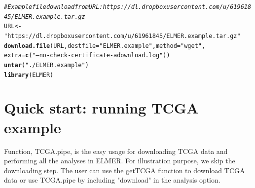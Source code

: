 \documentclass{article}\usepackage[]{graphicx}\usepackage[]{color}
\makeatletter
\newcommand{\hlstr}[1]{\textcolor[rgb]{0.192,0.494,0.8}{#1}}%
\newcommand{\hlcom}[1]{\textcolor[rgb]{0.678,0.584,0.686}{\textit{#1}}}%
\newcommand{\hlstd}[1]{\textcolor[rgb]{0.345,0.345,0.345}{#1}}%
\newcommand{\hlkwb}[1]{\textcolor[rgb]{0.69,0.353,0.396}{#1}}%
\newcommand{\hlkwc}[1]{\textcolor[rgb]{0.333,0.667,0.333}{#1}}%
\newcommand{\hlkwd}[1]{\textcolor[rgb]{0.737,0.353,0.396}{\textbf{#1}}}%
\newenvironment{kframe}{%
 \def\at@end@of@kframe{}%
 \ifinner\ifhmode%
  \def\at@end@of@kframe{\end{minipage}}%
  \begin{minipage}{\columnwidth}%
 \fi\fi%
 \def\FrameCommand##1{\hskip\@totalleftmargin \hskip-\fboxsep
 \colorbox{shadecolor}{##1}\hskip-\fboxsep
     \hskip-\linewidth \hskip-\@totalleftmargin \hskip\columnwidth}%
 \MakeFramed {\advance\hsize-\width
   \@totalleftmargin\z@ \linewidth\hsize
   \@setminipage}}%
 {\par\unskip\endMakeFramed%
 \at@end@of@kframe}
\newenvironment{knitrout}{}{} %
\makeatother
\begin{document}
\begin{knitrout}
\color{fgcolor}\begin{kframe}
\begin{alltt}
\hlcom{#Example file download from URL: https://dl.dropboxusercontent.com/u/61961845/ELMER.example.tar.gz}
\hlstd{URL} \hlkwb{<-} \hlstr{"https://dl.dropboxusercontent.com/u/61961845/ELMER.example.tar.gz"}
\hlkwd{download.file}\hlstd{(URL,}\hlkwc{destfile} \hlstd{=} \hlstr{"ELMER.example"}\hlstd{,}\hlkwc{method}\hlstd{=} \hlstr{"wget"}\hlstd{,}
              \hlkwc{extra} \hlstd{=} \hlkwd{c}\hlstd{(}\hlstr{"--no-check-certificate -a download.log"}\hlstd{))}
\hlkwd{untar}\hlstd{(}\hlstr{"./ELMER.example"}\hlstd{)}
\hlkwd{library}\hlstd{(ELMER)}
\end{alltt}
\end{kframe}
\end{knitrout}


\section{Quick start: running TCGA example}
Function, TCGA.pipe, is the easy usage for downloading TCGA data and performing all 
the analyses in ELMER. For illustration purpose, we skip the downloading step. 
The user can use the getTCGA function to download TCGA data or
use TCGA.pipe by including "download" in the analysis option.
\end{document}

